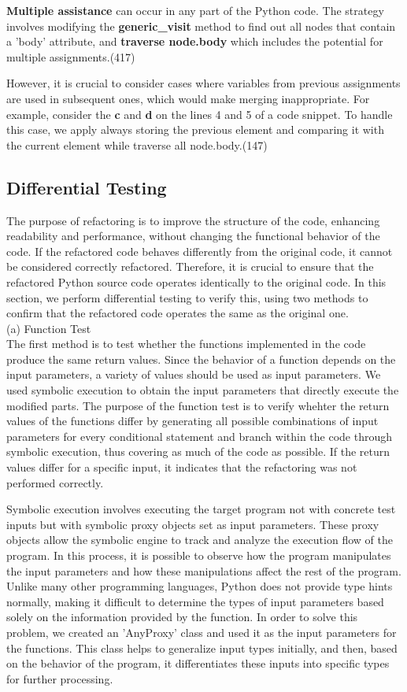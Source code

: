 \documentclass[11pt]{article}
\begin{document}
\textbf{Multiple assistance} can occur in any part of the Python code. The strategy involves modifying the \textbf{generic\_visit} method to find out all nodes that contain a 'body' attribute, and \textbf{traverse node.body} which includes the potential for multiple assignments.(417)

However, it is crucial to consider cases where variables from previous assignments are used in subsequent ones, which would make merging inappropriate. For example, consider the \textbf{c} and \textbf{d} on the lines 4 and 5 of a code snippet. To handle this case, we apply always storing the previous element and comparing it with the current element while traverse all node.body.(147)

\subsection{Differential Testing}
The purpose of refactoring is to improve the structure of the code, enhancing readability and performance, without changing the functional behavior of the code. If the refactored code behaves differently from the original code, it cannot be considered correctly refactored. Therefore, it is crucial to ensure that the refactored Python source code operates identically to the original code. In this section, we perform differential testing to verify this, using two methods to confirm that the refactored code operates the same as the original one. \\

(a) Function Test\\

The first method is to test whether the functions implemented in the code produce the same return values. Since the behavior of a function depends on the input parameters, a variety of values should be used as input parameters. We used symbolic execution to obtain the input parameters that directly execute the modified parts. The purpose of the function test is to verify whehter the return values of the functions differ by generating all possible combinations of input parameters for every conditional statement and branch within the code through symbolic execution, thus covering as much of the code as possible. If the return values differ for a specific input, it indicates that the refactoring was not performed correctly.

Symbolic execution involves executing the target program not with concrete test inputs but with symbolic proxy objects set as input parameters. These proxy objects allow the symbolic engine to track and analyze the execution flow of the program. In this process, it is possible to observe how the program manipulates the input parameters and how these manipulations affect the rest of the program.
Unlike many other programming languages, Python does not provide type hints normally, making it difficult to determine the types of input parameters based solely on the information provided by the function. In order to solve this problem, we created an 'AnyProxy' class and used it as the input parameters for the functions. This class helps to generalize input types initially, and then, based on the behavior of the program, it differentiates these inputs into specific types for further processing.
\end{document}
